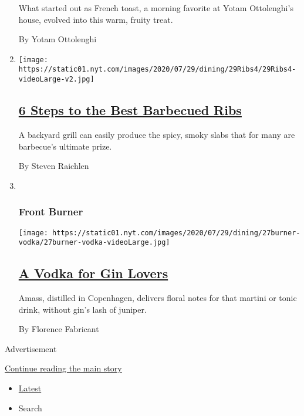 \begin{enumerate}
  What started out as French toast, a morning favorite at Yotam
  Ottolenghi's house, evolved into this warm, fruity treat.

  By Yotam Ottolenghi
\item
  \texttt{[image: https://static01.nyt.com/images/2020/07/29/dining/29Ribs4/29Ribs4-videoLarge-v2.jpg]}

  \hypertarget{6-steps-to-the-best-barbecued-ribs}{%
  \subsection{\texorpdfstring{\href{/2020/07/24/dining/bbq-ribs-recipe.html}{6
  Steps to the Best Barbecued
  Ribs}}{6 Steps to the Best Barbecued Ribs}}\label{6-steps-to-the-best-barbecued-ribs}}

  A backyard grill can easily produce the spicy, smoky slabs that for
  many are barbecue's ultimate prize.

  By Steven Raichlen
\item ~
  \hypertarget{front-burner}{%
  \subsubsection{Front Burner}\label{front-burner}}

  \texttt{[image: https://static01.nyt.com/images/2020/07/29/dining/27burner-vodka/27burner-vodka-videoLarge.jpg]}

  \hypertarget{a-vodka-for-gin-lovers}{%
  \subsection{\texorpdfstring{\href{/2020/07/27/dining/amass-vodka.html}{A
  Vodka for Gin
  Lovers}}{A Vodka for Gin Lovers}}\label{a-vodka-for-gin-lovers}}

  Amass, distilled in Copenhagen, delivers floral notes for that martini
  or tonic drink, without gin's lash of juniper.

  By Florence Fabricant
\end{enumerate}

Advertisement

\protect\hyperlink{after-mid1}{Continue reading the main story}

\begin{itemize}
\tightlist
\item
  \protect\hyperlink{stream-panel}{Latest}
\item
  Search
\end{itemize}

